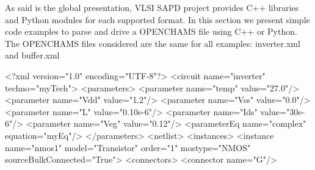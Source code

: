 As said is the global presentation, V\+L\+SI S\+A\+PD project provides C++ libraries and Python modules for each supported format. In this section we present simple code examples to parse and drive a O\+P\+E\+N\+C\+H\+A\+MS file using C++ or Python. The O\+P\+E\+N\+C\+H\+A\+MS files considered are the same for all examples\+: {\ttfamily inverter.\+xml} and {\ttfamily buffer.\+xml} 
\begin{DoxyCodeInclude}
<?\textcolor{keyword}{xml} \textcolor{keyword}{version}=\textcolor{stringliteral}{"1.0"} \textcolor{keyword}{encoding}=\textcolor{stringliteral}{"UTF-8"}?>
<\textcolor{keywordtype}{circuit} \textcolor{keyword}{name}=\textcolor{stringliteral}{"inverter"} \textcolor{keyword}{techno}=\textcolor{stringliteral}{"myTech"}>
  <\textcolor{keywordtype}{parameters}>
    <\textcolor{keywordtype}{parameter}   \textcolor{keyword}{name}=\textcolor{stringliteral}{"temp"}    \textcolor{keyword}{value}=\textcolor{stringliteral}{"27.0"}/>
    <\textcolor{keywordtype}{parameter}   \textcolor{keyword}{name}=\textcolor{stringliteral}{"Vdd"}     \textcolor{keyword}{value}=\textcolor{stringliteral}{"1.2"}/>
    <\textcolor{keywordtype}{parameter}   \textcolor{keyword}{name}=\textcolor{stringliteral}{"Vss"}     \textcolor{keyword}{value}=\textcolor{stringliteral}{"0.0"}/>
    <\textcolor{keywordtype}{parameter}   \textcolor{keyword}{name}=\textcolor{stringliteral}{"L"}       \textcolor{keyword}{value}=\textcolor{stringliteral}{"0.10e-6"}/>
    <\textcolor{keywordtype}{parameter}   \textcolor{keyword}{name}=\textcolor{stringliteral}{"Ids"}     \textcolor{keyword}{value}=\textcolor{stringliteral}{"30e-6"}/>
    <\textcolor{keywordtype}{parameter}   \textcolor{keyword}{name}=\textcolor{stringliteral}{"Veg"}     \textcolor{keyword}{value}=\textcolor{stringliteral}{"0.12"}/>
    <\textcolor{keywordtype}{parameterEq} \textcolor{keyword}{name}=\textcolor{stringliteral}{"complex"} \textcolor{keyword}{equation}=\textcolor{stringliteral}{"myEq"}/>
  </\textcolor{keywordtype}{parameters}>
  <\textcolor{keywordtype}{netlist}>
    <\textcolor{keywordtype}{instances}>
      <\textcolor{keywordtype}{instance} \textcolor{keyword}{name}=\textcolor{stringliteral}{"nmos1"} \textcolor{keyword}{model}=\textcolor{stringliteral}{"Transistor"} \textcolor{keyword}{order}=\textcolor{stringliteral}{"1"} \textcolor{keyword}{mostype}=\textcolor{stringliteral}{"NMOS"} \textcolor{keyword}{sourceBulkConnected}=\textcolor{stringliteral}{"True"}>
        <\textcolor{keywordtype}{connectors}>
          <\textcolor{keywordtype}{connector} \textcolor{keyword}{name}=\textcolor{stringliteral}{"G"}/>

\end{DoxyCodeInclude}
